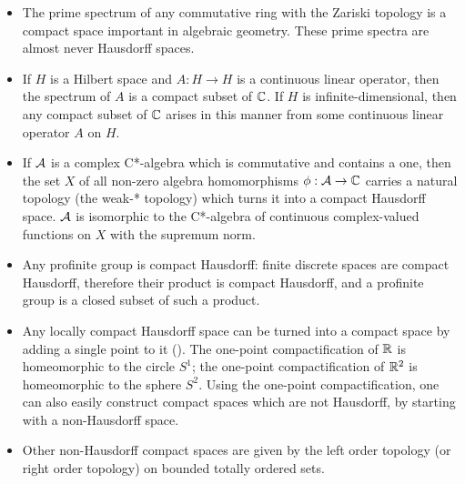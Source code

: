 \documentclass[12pt]{article}
\begin{document}
\begin{itemize}
\item The prime spectrum of any commutative ring with the Zariski topology is a compact space important in algebraic geometry. These prime spectra are almost never Hausdorff spaces.

\item If $H$ is a Hilbert space and $A : H \rightarrow H$ is a continuous linear operator, then the spectrum of $A$ is a compact subset of $\Bbb{C}$. If $H$ is infinite-dimensional, then any compact subset of $\Bbb{C}$ arises in this manner from some continuous linear operator $A$ on $H$.

\item If $\cal{A}$ is a complex C*-algebra which is commutative and contains a one, then the set $X$ of all non-zero algebra homomorphisms $\phi : \cal{A} \rightarrow \Bbb{C}$ carries a natural topology (the weak-* topology) which turns it into a compact Hausdorff space. $\cal{A}$ is isomorphic to the C*-algebra of continuous complex-valued functions on $X$ with the supremum norm.

\item Any profinite group is compact Hausdorff: finite discrete spaces are compact Hausdorff, therefore their product is compact Hausdorff, and a profinite group is a closed subset of such a product.

\item Any locally compact Hausdorff space can be turned into a compact space by adding a single point to it (). The one-point compactification of $\Bbb{R}$ is homeomorphic to the circle $S^1$; the one-point compactification of $\Bbb{R}^2$ is homeomorphic to the sphere $S^2$. Using the one-point compactification, one can also easily construct compact spaces which are not Hausdorff, by starting with a non-Hausdorff space.

\item Other non-Hausdorff compact spaces are given by the left order topology (or right order topology) on bounded totally ordered sets.

\end{itemize}
\end{document}
